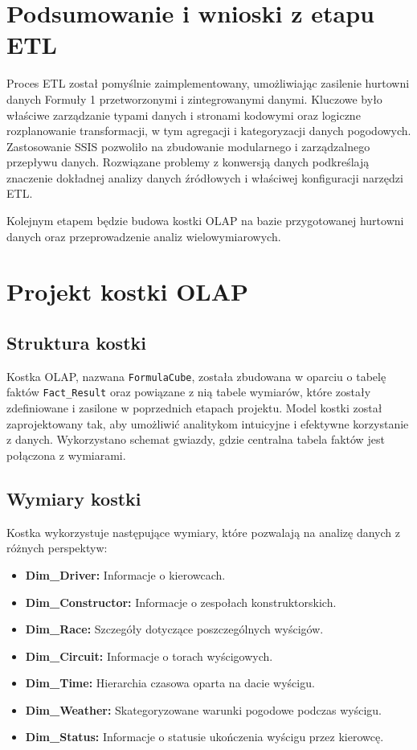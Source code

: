 \documentclass[a4paper,12pt]{article}
\begin{document}
\section{Podsumowanie i wnioski z etapu ETL}
Proces ETL został pomyślnie zaimplementowany, umożliwiając zasilenie hurtowni danych Formuły 1 przetworzonymi i zintegrowanymi danymi. Kluczowe było właściwe zarządzanie typami danych i stronami kodowymi oraz logiczne rozplanowanie transformacji, w tym agregacji i kategoryzacji danych pogodowych. Zastosowanie SSIS pozwoliło na zbudowanie modularnego i zarządzalnego przepływu danych. Rozwiązane problemy z konwersją danych podkreślają znaczenie dokładnej analizy danych źródłowych i właściwej konfiguracji narzędzi ETL.

Kolejnym etapem będzie budowa kostki OLAP na bazie przygotowanej hurtowni danych oraz przeprowadzenie analiz wielowymiarowych.

\section{Projekt kostki OLAP}

\subsection{Struktura kostki}
Kostka OLAP, nazwana \texttt{FormulaCube}, została zbudowana w oparciu o tabelę faktów \texttt{Fact\_Result} oraz powiązane z nią tabele wymiarów, które zostały zdefiniowane i zasilone w poprzednich etapach projektu. Model kostki został zaprojektowany tak, aby umożliwić analitykom intuicyjne i efektywne korzystanie z danych. Wykorzystano schemat gwiazdy, gdzie centralna tabela faktów jest połączona z wymiarami.

\subsection{Wymiary kostki}
Kostka wykorzystuje następujące wymiary, które pozwalają na analizę danych z różnych perspektyw:
\begin{itemize}
  \item \textbf{Dim\_Driver:} Informacje o kierowcach.
  \item \textbf{Dim\_Constructor:} Informacje o zespołach konstruktorskich.
  \item \textbf{Dim\_Race:} Szczegóły dotyczące poszczególnych wyścigów.
  \item \textbf{Dim\_Circuit:} Informacje o torach wyścigowych.
  \item \textbf{Dim\_Time:} Hierarchia czasowa oparta na dacie wyścigu.
  \item \textbf{Dim\_Weather:} Skategoryzowane warunki pogodowe podczas wyścigu.
  \item \textbf{Dim\_Status:} Informacje o statusie ukończenia wyścigu przez kierowcę.
\end{itemize}
\end{document}
